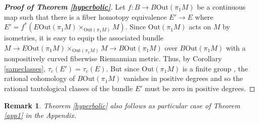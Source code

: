 \documentclass[onecolumn,notitlepage,11pt]{article}
\newtheorem{rmk}{Remark}
\theoremstyle{definition}
\begin{document}
\begin{proof}[\textbf{Proof of Theorem \ref{hyperbolic}}]
Let $f:B\to B\mbox{Out}(\pi_1M)$ be a continuous map such that there is a fiber
homotopy equivalence $E'\to E$ where
$E'=f^*(E\mbox{Out}(\pi_1M)\times_{\mbox{Out}(\pi_1M)}M)$. Since
$\mbox{Out}(\pi_1M)$ acts on $M$ by isometries, it is easy to equip the associated bundle
$M\to E\mbox{Out}(\pi_1M)\times_{\mbox{Out}(\pi_1M)}M\to B\mbox{Out}(\pi_1M)$ over
$B\mbox{Out}(\pi_1M)$ with a
nonpositively curved fiberwise Riemannian metric. Thus, by 
Corollary \ref{sameclasses}, $\tau_c(E')=\tau_c(E)$. But since
$\mbox{Out}(\pi_1M)$  is a finite group \cite{Borel}, the rational
cohomology of $B\mbox{Out}(\pi_1M)$ vanishes in positive degrees and so
the rational
tautological classes of the bundle $E'$ must be zero in positive degrees.
\end{proof}
\begin{rmk}
Theorem \ref{hyperbolic} also follows as particular case of 
Theorem \ref{app1} in the Appendix.
\end{rmk}
\end{document}
